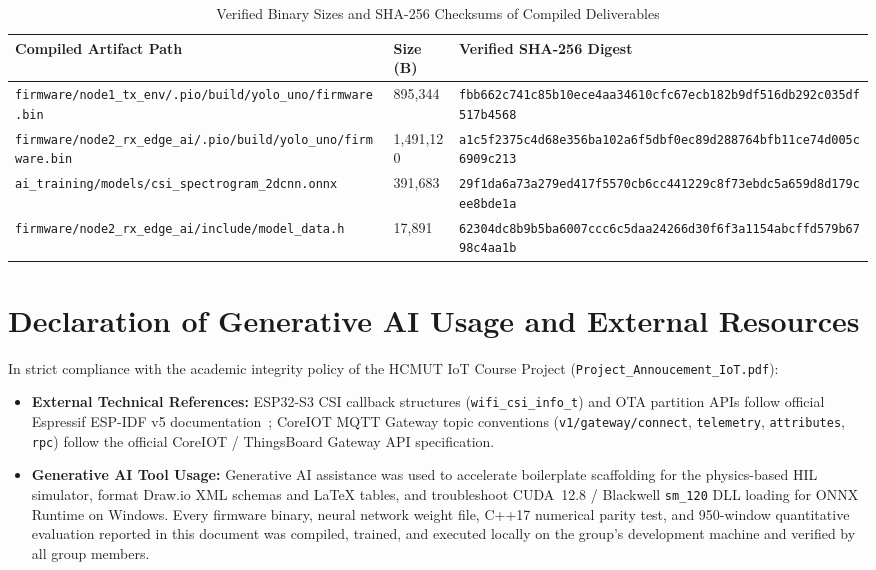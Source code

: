 \documentclass{hcmut-report}
\begin{document}
\begin{table}[H]
\centering
\caption{Verified Binary Sizes and SHA-256 Checksums of Compiled Deliverables}
\label{tab:sha256_artifacts}
\footnotesize
\begin{tabularx}{\textwidth}{|P{5.1cm}|R{1.9cm}|Y|}
\hline
\textbf{Compiled Artifact Path} & \textbf{Size (B)} & \textbf{Verified SHA-256 Digest} \\
\hline
\texttt{firmware/\allowbreak node1\_tx\_env/\allowbreak .pio/\allowbreak build/\allowbreak yolo\_uno/\allowbreak firmware.bin} & 895,344 & \texttt{fbb662c741c85b10\allowbreak ece4aa34610cfc67\allowbreak ecb182b9df516db2\allowbreak 92c035df517b4568} \\
\hline
\texttt{firmware/\allowbreak node2\_rx\_edge\_ai/\allowbreak .pio/\allowbreak build/\allowbreak yolo\_uno/\allowbreak firmware.bin} & 1,491,120 & \texttt{a1c5f2375c4d68e3\allowbreak 56ba102a6f5dbf0e\allowbreak c89d288764bfb11c\allowbreak e74d005c6909c213} \\
\hline
\texttt{ai\_training/\allowbreak models/\allowbreak csi\_spectrogram\_2dcnn.onnx} & 391,683 & \texttt{29f1da6a73a279ed\allowbreak 417f5570cb6cc441\allowbreak 229c8f73ebdc5a65\allowbreak 9d8d179cee8bde1a} \\
\hline
\texttt{firmware/\allowbreak node2\_rx\_edge\_ai/\allowbreak include/\allowbreak model\_data.h} & 17,891 & \texttt{62304dc8b9b5ba60\allowbreak 07ccc6c5daa24266\allowbreak d30f6f3a1154abcf\allowbreak fd579b6798c4aa1b} \\
\hline
\end{tabularx}
\end{table}

\section[AI Usage \& External Resource Declaration]{Declaration of Generative AI Usage and External Resources}
\label{app:ai_declaration}

In strict compliance with the academic integrity policy of the HCMUT IoT Course Project (\texttt{Project\_Annoucement\_IoT.pdf}):
\begin{itemize}
  \item \textbf{External Technical References:} ESP32-S3 CSI callback structures (\texttt{wifi\_csi\_info\_t}) and OTA partition APIs follow official Espressif ESP-IDF v5 documentation~\cite{espressif_csi}; CoreIOT MQTT Gateway topic conventions (\texttt{v1/gateway/connect}, \texttt{telemetry}, \texttt{attributes}, \texttt{rpc}) follow the official CoreIOT / ThingsBoard Gateway API specification.
  \item \textbf{Generative AI Tool Usage:} Generative AI assistance was used to accelerate boilerplate scaffolding for the physics-based HIL simulator, format Draw.io XML schemas and LaTeX tables, and troubleshoot CUDA~12.8 / Blackwell \texttt{sm\_120} DLL loading for ONNX Runtime on Windows. Every firmware binary, neural network weight file, C++17 numerical parity test, and 950-window quantitative evaluation reported in this document was compiled, trained, and executed locally on the group's development machine and verified by all group members.
\end{itemize}
\end{document}
